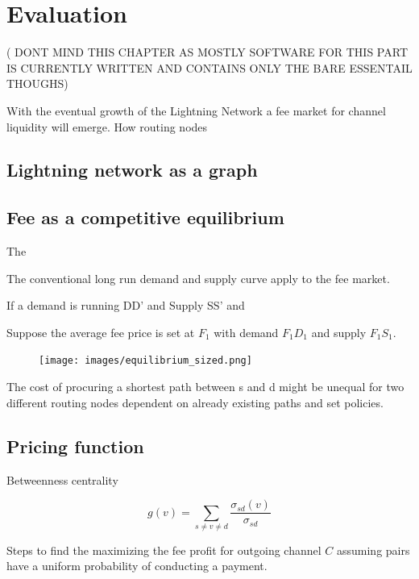 \chapter{Evaluation}

( DONT MIND THIS CHAPTER AS MOSTLY SOFTWARE FOR THIS PART IS CURRENTLY WRITTEN AND CONTAINS ONLY THE BARE ESSENTAIL THOUGHS)

With the eventual growth of the Lightning Network a fee market for channel liquidity will emerge. How routing nodes 

\section{Lightning network as a graph}




\section{Fee as a competitive equilibrium}

The

The conventional long run demand and supply curve apply to the fee market.

If a demand is running DD' and Supply SS' and

Suppose the average fee price is set at $F_{1}$ with demand $F_{1}D_{1}$ and supply $F_{1}S_{1}$.

\begin{figure}[!htb]
	\hspace*{-0.7cm} 
	\centering
	\texttt{[image: images/equilibrium\_sized.png]}
	\caption{ 
		}
		\label{fig:equilibrium}
		\hspace*{2mm} 	
\end{figure}



The cost of procuring a shortest path between s and d might be unequal for two different routing nodes dependent on already existing paths and set policies.

\section{Pricing function}

Betweenness centrality

\[ g(v) = \sum_{s \neq v \neq d}\frac{\sigma_{sd}(v)}{\sigma_{sd}} \]

Steps to find the maximizing the fee profit for outgoing channel $C$ assuming pairs have a uniform probability of conducting a payment.

